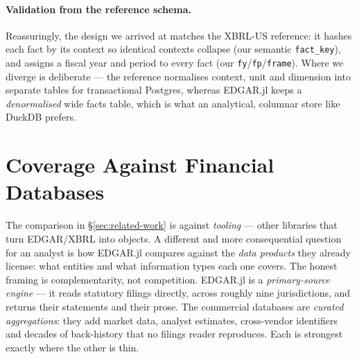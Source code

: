 \documentclass[11pt,a4paper]{report}
\begin{document}
\paragraph{Validation from the reference schema.} Reassuringly, the design we arrived at matches
the XBRL-US reference: it hashes each fact by its context so identical contexts collapse (our
semantic \texttt{fact\_key}), and assigns a fiscal year and period to every fact (our
\texttt{fy}/\texttt{fp}/\texttt{frame}). Where we diverge is deliberate --- the reference
normalises context, unit and dimension into separate tables for transactional Postgres, whereas
EDGAR.jl keeps a \emph{denormalised} wide facts table, which is what an analytical, columnar
store like DuckDB prefers.


\section{Coverage Against Financial Databases}
\label{sec:db-comparison}

The comparison in \S\ref{sec:related-work} is against \emph{tooling} --- other libraries that
turn EDGAR/XBRL into objects. A different and more consequential question for an analyst is how
EDGAR.jl compares against the \emph{data products} they already license: what entities and what
information types each one covers. The honest framing is complementarity, not competition.
EDGAR.jl is a \emph{primary-source engine} --- it reads statutory filings directly, across roughly
nine jurisdictions, and returns their statements and their prose. The commercial databases are
\emph{curated aggregations}: they add market data, analyst estimates, cross-vendor identifiers and
decades of back-history that no filings reader reproduces. Each is strongest exactly where the
other is thin.
\end{document}
